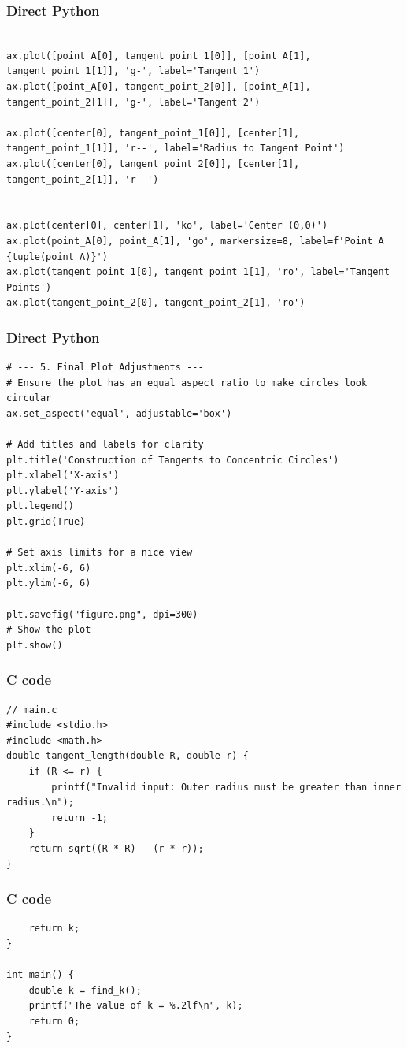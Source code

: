 \documentclass{beamer}
\begin{document}
\begin{frame}[fragile]
\frametitle{Direct Python}
\begin{lstlisting}

ax.plot([point_A[0], tangent_point_1[0]], [point_A[1], tangent_point_1[1]], 'g-', label='Tangent 1')
ax.plot([point_A[0], tangent_point_2[0]], [point_A[1], tangent_point_2[1]], 'g-', label='Tangent 2')

ax.plot([center[0], tangent_point_1[0]], [center[1], tangent_point_1[1]], 'r--', label='Radius to Tangent Point')
ax.plot([center[0], tangent_point_2[0]], [center[1], tangent_point_2[1]], 'r--')


ax.plot(center[0], center[1], 'ko', label='Center (0,0)')
ax.plot(point_A[0], point_A[1], 'go', markersize=8, label=f'Point A {tuple(point_A)}')
ax.plot(tangent_point_1[0], tangent_point_1[1], 'ro', label='Tangent Points')
ax.plot(tangent_point_2[0], tangent_point_2[1], 'ro')
\end{lstlisting}
\end{frame}
\begin{frame}[fragile]
\frametitle{Direct Python}
\begin{lstlisting}
# --- 5. Final Plot Adjustments ---
# Ensure the plot has an equal aspect ratio to make circles look circular
ax.set_aspect('equal', adjustable='box')

# Add titles and labels for clarity
plt.title('Construction of Tangents to Concentric Circles')
plt.xlabel('X-axis')
plt.ylabel('Y-axis')
plt.legend()
plt.grid(True)

# Set axis limits for a nice view
plt.xlim(-6, 6)
plt.ylim(-6, 6)

plt.savefig("figure.png", dpi=300)
# Show the plot
plt.show()
\end{lstlisting}
\end{frame}
\begin{frame}[fragile]
\frametitle{C code}
\begin{lstlisting}
// main.c
#include <stdio.h>
#include <math.h>
double tangent_length(double R, double r) {
    if (R <= r) {
        printf("Invalid input: Outer radius must be greater than inner radius.\n");
        return -1;
    }
    return sqrt((R * R) - (r * r));
}
\end{lstlisting}
\end{frame}
\begin{frame}[fragile]
\frametitle{C code}
\begin{lstlisting}
    return k;
}

int main() {
    double k = find_k();
    printf("The value of k = %.2lf\n", k);
    return 0;
}
\end{lstlisting}
\end{frame}
\end{document}
